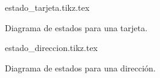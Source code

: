 \begin{figure}
  \begin{center}
    {estado_tarjeta.tikz.tex}
    \caption{Diagrama de estados para una tarjeta.}
    \label{lib_fig:estado_tarjeta}
  \end{center}
\end{figure}

\begin{figure}
  \begin{center}
    {estado_direccion.tikz.tex}
    \caption{Diagrama de estados para una dirección.}
    \label{lib_fig:estado_direccion}
  \end{center}
\end{figure}
